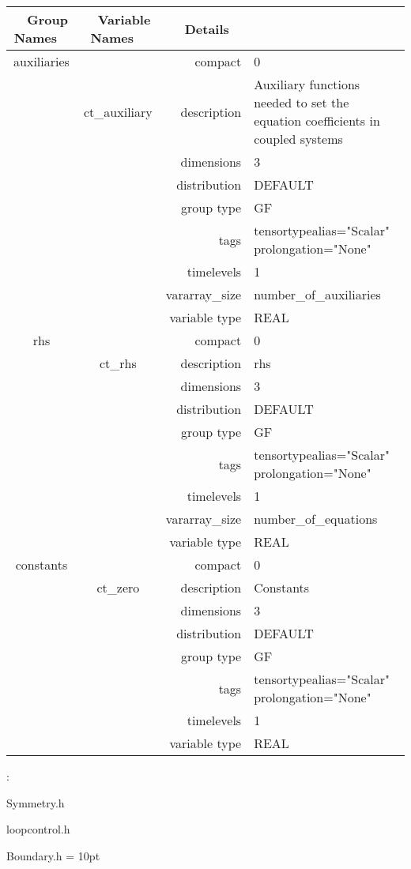 \begin{tabular*}{150mm}{|c|c@{\extracolsep{\fill}}|rl|} \hline 
~ {\bf Group Names} ~ & ~ {\bf Variable Names} ~  &{\bf Details} ~ & ~ \\ 
\hline 
auxiliaries &  & compact & 0 \\ 
 & ct\_auxiliary & description & Auxiliary functions needed to set the equation coefficients in coupled systems \\ 
 &  & dimensions & 3 \\ 
 &  & distribution & DEFAULT \\ 
 &  & group type & GF \\ 
 &  & tags & tensortypealias="Scalar" prolongation="None" \\ 
 &  & timelevels & 1 \\ 
 &  & vararray\_size & number\_of\_auxiliaries \\ 
 &  & variable type & REAL \\ 
\hline 
rhs &  & compact & 0 \\ 
 & ct\_rhs & description & rhs \\ 
 &  & dimensions & 3 \\ 
 &  & distribution & DEFAULT \\ 
 &  & group type & GF \\ 
 &  & tags & tensortypealias="Scalar" prolongation="None" \\ 
 &  & timelevels & 1 \\ 
 &  & vararray\_size & number\_of\_equations \\ 
 &  & variable type & REAL \\ 
\hline 
constants &  & compact & 0 \\ 
 & ct\_zero & description & Constants \\ 
 &  & dimensions & 3 \\ 
 &  & distribution & DEFAULT \\ 
 &  & group type & GF \\ 
 &  & tags & tensortypealias="Scalar" prolongation="None" \\ 
 &  & timelevels & 1 \\ 
 &  & variable type & REAL \\ 
\hline 
\end{tabular*} 



\vspace{5mm}

: 

Symmetry.h

loopcontrol.h

Boundary.h
\vspace{2mm}\parskip = 10pt 
